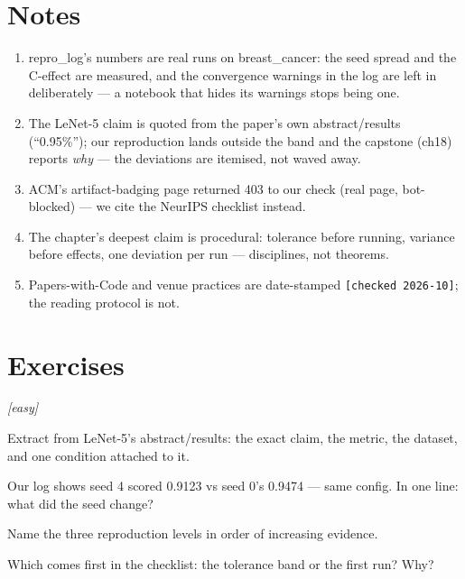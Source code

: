 \section*{Notes}
\begin{enumerate}
\item[\textbf{1.}] repro\_log's numbers are real runs on
breast\_cancer: the seed spread and the C-effect are measured, and
the convergence warnings in the log are left in deliberately ---
a notebook that hides its warnings stops being one.
\item[\textbf{2.}] The LeNet-5 claim is quoted from the paper's own
abstract/results (``0.95\%''); our reproduction lands outside the
band and the capstone (ch18) reports \emph{why} --- the deviations
are itemised, not waved away.
\item[\textbf{3.}] ACM's artifact-badging page returned 403 to our
check (real page, bot-blocked) --- we cite the NeurIPS checklist
instead.
\item[\textbf{4.}] The chapter's deepest claim is procedural:
tolerance before running, variance before effects, one deviation
per run --- disciplines, not theorems.
\item[\textbf{5.}] Papers-with-Code and venue practices are
date-stamped \texttt{[checked 2026-10]}; the reading protocol is
not.
\end{enumerate}

\section{Exercises}
\label{sec:paperex}

\emph{[easy]}
\begin{exercise}
Extract from LeNet-5's abstract/results: the exact claim, the
metric, the dataset, and one condition attached to it.
\end{exercise}
\begin{exercise}
Our log shows seed 4 scored 0.9123 vs seed 0's 0.9474 --- same
config. In one line: what did the seed change?
\end{exercise}
\begin{exercise}
Name the three reproduction levels in order of increasing
evidence.
\end{exercise}
\begin{exercise}
Which comes first in the checklist: the tolerance band or the
first run? Why?
\end{exercise}

